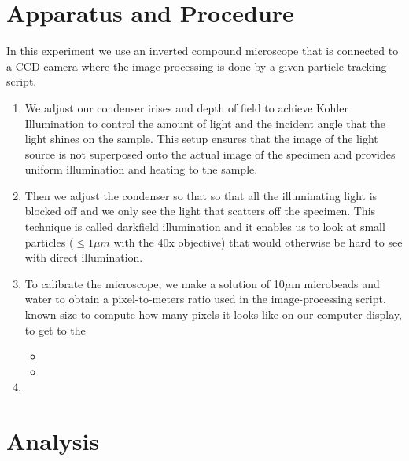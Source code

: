 \documentclass[iop,revtex4]{emulateapj_mod}
\begin{document}
\section{Apparatus and Procedure}\label{sec:ap}
In this experiment we use an inverted compound microscope that is connected to a CCD camera where the image processing is done by a given particle tracking script.
\begin{enumerate}
\item  We adjust our condenser irises and depth of field to achieve Kohler Illumination to control the amount of light and the incident angle that the light shines on the sample. This setup ensures that the image of the light source is not superposed onto the actual image of the specimen and provides uniform illumination and heating to the sample.  
\item  Then we adjust the condenser so that so that all the illuminating light is blocked off and we only see the light that scatters off the specimen. This technique is called darkfield  illumination and it enables us to look at small particles ($\leq1\mu m$ with the 40x objective) that would otherwise be hard to see with direct illumination.
\item To calibrate the microscope, we make a solution of 10$\mu$m microbeads and water to obtain a pixel-to-meters ratio used in the image-processing script. known size
 to compute how many pixels it looks like on our computer display, 
to get to the
	\begin{itemize}
	\item 
	\item 
	\end{itemize}
\item 
\end{enumerate}
\section{Analysis}\label{sec:analysis}
\end{document}

